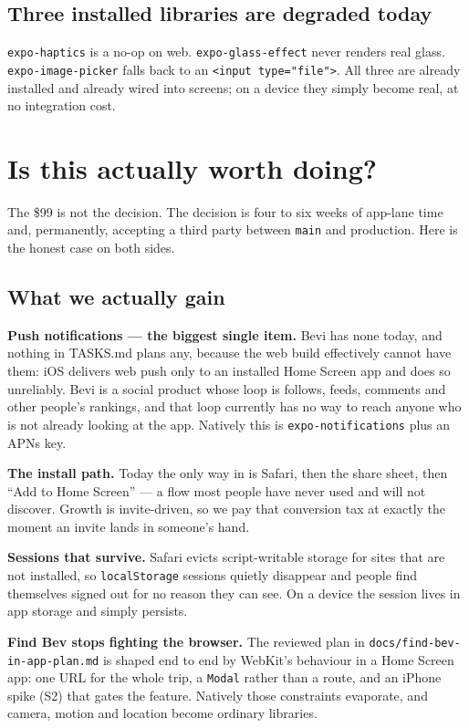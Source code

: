 \documentclass[11pt]{article}
\newcommand{\code}[1]{\texttt{\small #1}}
\newcommand{\bk}{\discretionary{}{}{}}
\begin{document}
\subsection{Three installed libraries are degraded today}

\code{expo-haptics} is a no-op on web. \code{expo-glass-effect} never renders real glass.
\code{expo-image-picker} falls back to an \code{<input type="file">}. All three are already installed
and already wired into screens; on a device they simply become real, at no integration cost.

\section{Is this actually worth doing?}

The \$99 is not the decision. The decision is four to six weeks of app-lane time and, permanently,
accepting a third party between \code{main} and production. Here is the honest case on both sides.

\subsection{What we actually gain}

\textbf{Push notifications --- the biggest single item.} Bevi has none today, and nothing in TASKS.md
plans any, because the web build effectively cannot have them: iOS delivers web push only to an
installed Home Screen app and does so unreliably. Bevi is a social product whose loop is follows,
feeds, comments and other people's rankings, and that loop currently has no way to reach anyone who
is not already looking at the app. Natively this is \code{expo-notifications} plus an APNs key.

\textbf{The install path.} Today the only way in is Safari, then the share sheet, then ``Add to Home
Screen'' --- a flow most people have never used and will not discover. Growth is invite-driven, so we
pay that conversion tax at exactly the moment an invite lands in someone's hand.

\textbf{Sessions that survive.} Safari evicts script-writable storage for sites that are not
installed, so \code{localStorage} sessions quietly disappear and people find themselves signed out
for no reason they can see. On a device the session lives in app storage and simply persists.

\textbf{Find Bev stops fighting the browser.} The reviewed plan in
\code{docs/find-bev-in-\bk app-plan.md} is shaped end to end by WebKit's behaviour in a Home Screen
app: one URL for the whole trip, a \code{Modal} rather than a route, and an iPhone spike (S2) that
gates the feature. Natively those constraints evaporate, and camera, motion and location become
ordinary libraries.
\end{document}

